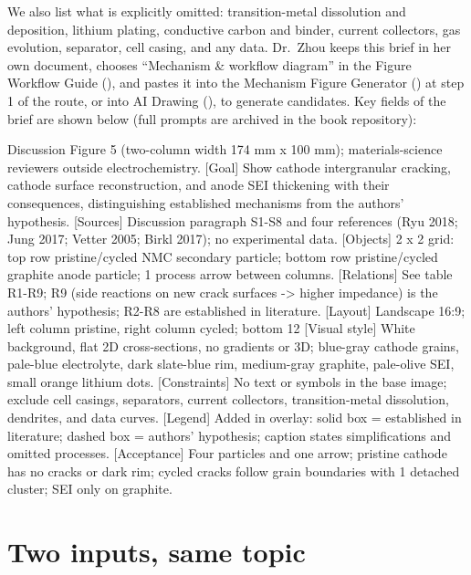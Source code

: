 We also list what is explicitly omitted: transition-metal dissolution and deposition, lithium plating, conductive carbon and binder, current collectors, gas evolution, separator, cell casing, and any data. Dr.\ Zhou keeps this brief in her own document, chooses ``Mechanism \& workflow diagram'' in the \scidraw{} Figure Workflow Guide (), and pastes it into the Mechanism Figure Generator () at step 1 of the route, or into AI Drawing (), to generate candidates. Key fields of the brief are shown below (full prompts are archived in the book repository):

\begin{Prompt}
 Discussion Figure 5 (two-column width 174 mm x 100 mm); materials-science reviewers outside electrochemistry.
[Goal] Show cathode intergranular cracking, cathode surface reconstruction, and anode SEI thickening with their consequences, distinguishing established mechanisms from the authors' hypothesis.
[Sources] Discussion paragraph S1-S8 and four references (Ryu 2018; Jung 2017; Vetter 2005; Birkl 2017); no experimental data.
[Objects] 2 x 2 grid: top row pristine/cycled NMC secondary particle; bottom row pristine/cycled graphite anode particle; 1 process arrow between columns.
[Relations] See table R1-R9; R9 (side reactions on new crack surfaces -> higher impedance) is the authors' hypothesis; R2-R8 are established in literature.
[Layout] Landscape 16:9; left column pristine, right column cycled; bottom 12%
[Visual style] White background, flat 2D cross-sections, no gradients or 3D; blue-gray cathode grains, pale-blue electrolyte, dark slate-blue rim, medium-gray graphite, pale-olive SEI, small orange lithium dots.
[Constraints] No text or symbols in the base image; exclude cell casings, separators, current collectors, transition-metal dissolution, dendrites, and data curves.
[Legend] Added in overlay: solid box = established in literature; dashed box = authors' hypothesis; caption states simplifications and omitted processes.
[Acceptance] Four particles and one arrow; pristine cathode has no cracks or dark rim; cycled cracks follow grain boundaries with 1 detached cluster; SEI only on graphite.
\end{Prompt}

\section{Two inputs, same topic}

